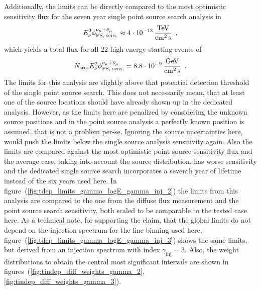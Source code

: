 Additionally, the limits can be directly compared to the most optimistic sensitivity flux for the seven year single point source search analysis in \cite{Aartsen:2016oji}
\begin{equation}
  E_\nu^2\phi^{\nu_\mu+\bar{\nu}_\mu}_\text{PS, sens.}
  \approx \SI{4e-13}{\TeV\per\cm\squared\per\second}
  \mcomma
\end{equation}
which yields a total flux for all $\num{22}$ high energy starting events of
\begin{equation}
  N_\text{srcs} E_\nu^2\phi^{\nu_\mu+\bar{\nu}_\mu}_\text{PS, sens.}
  = \SI{8.8e-9}{\GeV\per\cm\squared\per\second}
  \mperiod
\end{equation}
The limits for this analysis are slightly above that potential detection threshold of the single point source search.
This does not necessarily mean, that at least one of the source locations should have already shown up in the dedicated analysis.
However, as the limits here are penalized by considering the unknown source positions and in the point source analysis a perfectly known position is assumed, that is not a problem per-se.
Ignoring the source uncertainties here, would push the limits below the single source analysis sensitivity again.
Also the limits are compared against the most optimistic point source sensitivity flux and the average case, taking into account the source distribution, has worse sensitivity and the dedicated single source search incorporates a seventh year of lifetime instead of the six years used here.
In figure~(\ref{fig:tdep_limits_gamma_logE_gamma_inj_2}) the limits from this analysis are compared to the one from the diffuse flux measurement and the point source search sensitivity, both scaled to be comparable to the tested case here.
As a technical note, for supporting the claim, that the global limits do not depend on the injection spectrum for the fine binning used here, figure~(\ref{fig:tdep_limits_gamma_logE_gamma_inj_3}) shows the same limits, but derived from an injection spectrum with index $\gamma_\text{inj}=3$.
Also, the weight distributions to obtain the central most significant intervals are shown in figures~(\ref{fig:tindep_diff_weights_gamma_2}, \ref{fig:tindep_diff_weights_gamma_3}).

